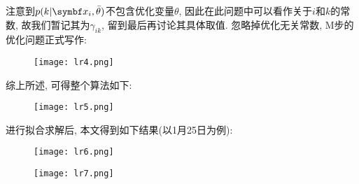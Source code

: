 注意到$p(k|\vect{x}_{i}, \bar{\theta})$不包含优化变量$\theta$, 因此在此问题中可以看作关于$i$和$k$的常数, 故我们暂记其为$\gamma_{ik}$, 留到最后再讨论其具体取值. 忽略掉优化无关常数, M步的优化问题正式写作:
\begin{figure}[H]
    \centering
    \texttt{[image: lr4.png]}
\end{figure}

综上所述, 可得整个算法如下:
\begin{figure}[H]
    \centering
    \texttt{[image: lr5.png]}
\end{figure}

进行拟合求解后, 本文得到如下结果(以1月25日为例):

\begin{figure}[H]
    \begin{minipage}[b]{0.49\textwidth}
        \centering
        \texttt{[image: lr6.png]}
    \end{minipage}
    \hfill
    \begin{minipage}[b]{0.49\textwidth}
        \centering
        \texttt{[image: lr7.png]}
    \end{minipage}
\end{figure}
